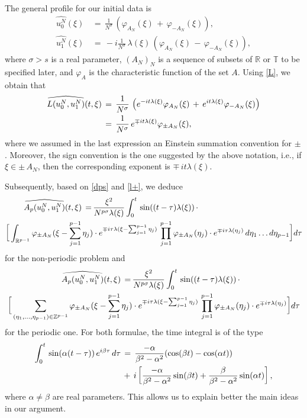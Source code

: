 \documentclass{amsart}
\newcommand{\R}{\mathbb{R}}
\begin{document}
The general profile for our initial data is
\begin{align}
\widehat{u^N_0}(\xi)\,&=\,\frac{1}{N^{\sigma}}\,\left(\varphi_{A_N}(\xi)\,+\,\varphi_{-A_N}(\xi)\right), \label{u0n}\\
\widehat{u^N_1}(\xi)\,&=\,-i \frac{1}{N^{\sigma}}\,\lambda(\xi)\,\left(\varphi_{A_N}(\xi)\,-\,\varphi_{-A_N}(\xi)\right),\label{u1n}
\end{align}
where $\sigma>s$ is a real parameter, $(A_N)_N$ is a sequence of subsets of $\R$ or $\mathbb{T}$ to be specified later, and $\varphi_A$ is the characteristic function of the set $A$. Using \eqref{L}, we obtain that
\begin{equation}\aligned
\widehat{L(u^N_0,u^N_1)}(t,\xi)\,&=\, \frac{1}{N^\sigma}\,\left(e^{-it\lambda(\xi)}\varphi_{A_N}(\xi)\,+\,e^{it\lambda(\xi)}\varphi_{-A_N}(\xi)\right)\\
&=\,\frac{1}{N^\sigma}\,e^{\mp it\lambda(\xi)}\varphi_{\pm A_N}(\xi),
\endaligned
\label{l+}
\end{equation}
where we assumed in the last expression an Einstein summation convention for $\pm$. Moreover, the sign convention is the one suggested by the above notation, i.e., if $\xi\in \pm \,A_N$, then the corresponding exponent is $\mp \,it\lambda(\xi)$. 

Subsequently, based on \eqref{dps} and \eqref{l+}, we deduce
\begin{equation}
\aligned
\widehat{A_p(u^N_0,u^N_1)}(t,\xi)\,=\,& \frac{\xi^2}{N^{p\sigma}\lambda(\xi)}\int_0^t \,\sin((t-\tau) \lambda(\xi))\,\cdot\\
\bigg[\int_{\R^{p-1}}\varphi_{\pm A_N}(\xi-\sum_{j=1}^{p-1} \eta_j)&\cdot e^{\mp i\tau\lambda(\xi-\sum_{j=1}^{p-1}\eta_j)}\,
\prod_{j=1}^{p-1}\varphi_{\pm A_N}(\eta_j)\cdot e^{\mp i\tau\lambda(\eta_j)}\,d\eta_1\ldots d\eta_{p-1}\bigg]d\tau
\endaligned
\label{apn}
\end{equation}
for the non-periodic problem and 
\begin{equation}
\aligned
\widehat{A_p(u^N_0,u^N_1)}(t,\xi)\,=\,& \frac{\xi^2}{N^{p\sigma}\lambda(\xi)}\int_0^t \,\sin((t-\tau) \lambda(\xi))\,\cdot\\
\bigg[\sum_{(\eta_1, \ldots, \eta_{p-1})\in \mathbb{Z}^{p-1}}\varphi_{\pm A_N}(\xi-\sum_{j=1}^{p-1} \eta_j)&\cdot e^{\mp i\tau\lambda(\xi-\sum_{j=1}^{p-1}\eta_j)}\,
\prod_{j=1}^{p-1}\varphi_{\pm A_N}(\eta_j)\cdot e^{\mp i\tau\lambda(\eta_j)}\bigg]d\tau
\endaligned
\label{app}
\end{equation}
for the periodic one. For both formulae, the time integral is of the type
\begin{equation}
\aligned
\int_0^t\,\sin(\alpha(t-\tau))\,e^{i\beta \tau}\,d\tau\,&=\,\frac{-\alpha}{\beta^2-\alpha^2}(\cos (\beta t)-\cos (\alpha t))\\
&+\,i\left[\frac{-\alpha}{\beta^2-\alpha^2}\sin (\beta t) + \frac{\beta}{\beta^2-\alpha^2}\sin (\alpha t)\right],
\endaligned
\label{calc}
\end{equation}
where $\alpha\neq \beta$ are real parameters. This allows us to explain better the main ideas in our argument. 
\end{document}
